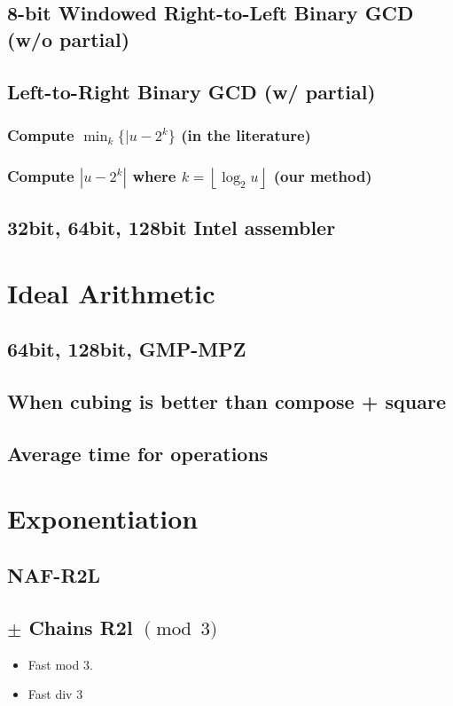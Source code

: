 \documentclass{ucalgthes1}
\theoremstyle{plain}
\theoremstyle{definition}
\newcommand{\floor}[1]{\left\lfloor #1 \right\rfloor}
\begin{document}
\subsection{8-bit Windowed Right-to-Left Binary GCD (w/o partial)}

\subsection{Left-to-Right Binary GCD (w/ partial)}
\subsubsection{Compute $\min_k \{|u-2^k\}$ (in the literature)}
\subsubsection{Compute $|u-2^k|$ where $k = \floor{\log_2u}$ (our method)}

\subsection{32bit, 64bit, 128bit Intel assembler}

\section{Ideal Arithmetic}
\label{sec:specializedTypes}
\subsection{64bit, 128bit, GMP-MPZ}
\subsection{When cubing is better than compose + square}
\subsection{Average time for operations}

\section{Exponentiation}
\label{sec:exponentiation}

\subsection{NAF-R2L}

\subsection{$\pm$ Chains R2l $\pmod 3$}
\begin{itemize}
\item Fast mod 3.
\item Fast div 3
\end{itemize}
\end{document}
